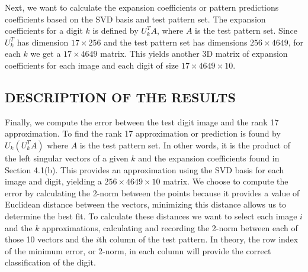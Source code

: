 \documentclass[dvipsnames,12pt]{article} %
\begin{document}
     \vspace{06pt}
     
     Next, we want to calculate the expansion coefficients or pattern predictions coefficients based on the SVD basis and test pattern set. The expansion coefficients for a digit $k$ is defined by $U_k^TA$, where $A$ is the test pattern set. Since $U_k^T$ has dimension $17\times256$ and the test pattern set has dimensions $256\times4649$, for each $k$ we get a $17\times4649$ matrix. This yields another 3D matrix of expansion coefficients for each image and each digit of size $17\times4649\times10$.



        \subsection{DESCRIPTION OF THE RESULTS}
          \label{SECT 04.02:SVD RESULTS}
          
          \vspace{06pt}
          
          Finally, we compute the error between the test digit image and the rank 17 approximation. To find the rank 17 approximation or prediction is found by $U_k(U_k^TA)$ where $A$ is the test pattern set. In other words, it is the product of the left singular vectors of a given $k$ and the expansion coefficients found in Section 4.1(b). This provides an approximation using the SVD basis for each image and digit, yielding a $256\times4649\times10$ matrix. We choose to compute the error by calculating the 2-norm between the points because it provides a value of Euclidean distance between the vectors, minimizing this distance allows us to determine the best fit. To calculate these distances we want to select each image $i$ and the $k$ approximations, calculating and recording the 2-norm between each of those 10 vectors and the $i$th column of the test pattern. In theory, the row index of the minimum error, or 2-norm, in each column will provide the correct classification of the digit.
      


            \newpage
\end{document}
